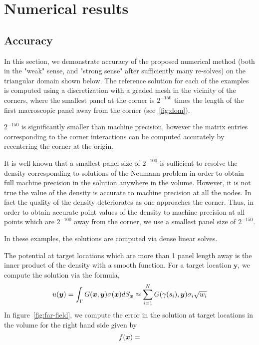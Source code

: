 
\section{Numerical results}
\subsection{Accuracy}
In this section, we demonstrate accuracy of the proposed numerical method (both in the "weak" sense, and 
"strong sense" after sufficiently many re-solves) on the triangular domain shown below. 
The reference solution for each of the examples is computed using a discretization with
a graded mesh in the vicinity of the corners, where the smallest panel at the corner is $2^{-150}$ times
the length of the first macroscopic panel away from the corner (see~\cref{fig:dom}). 
\begin{rem}
$2^{-150}$ is significantly smaller than machine precision, however the matrix entries corresponding to the
corner interactions can be computed accurately by recentering the corner at the origin. 
\end{rem} 
\begin{rem}
It is well-known that a smallest panel size of $2^{-100}$ is sufficient to resolve the density corresponding
to solutions of the Neumann problem in order to obtain full machine precision in the solution anywhere in the volume.
However, it is not true the value of the density is accurate to machine precision at all the nodes. In fact the quality
of the density deteriorates as one approaches the corner. Thus, in order to obtain accurate point values
of the density to machine precision at all points which are $2^{-100}$ away from the corner, we use a smallest
panel size of $2^{-150}$. 
\end{rem}
In these examples, the solutions are computed via dense linear solves.

The potential at target locations which are more than 1 panel length away is the inner product of the 
density with a smooth function. For a target location $\boldsymbol{y}$, we compute the solution via the formula,
\begin{equation}
u(\boldsymbol{y}) = \int_{\Gamma} G(\boldsymbol{x},\boldsymbol{y}) \sigma(\boldsymbol{x}) dS_{\boldsymbol{x}} \approx \sum_{i=1}^{N}  G(\gamma(s_{i}),\boldsymbol{y}) \sigma_{i} \sqrt{w_{i}}
\end{equation}
In figure~\cref{fig:far-field}, we compute the error in the solution at target
locations in the volume for the right hand side given by
\begin{equation}
f(\boldsymbol{x}) = 
\end{equation}

